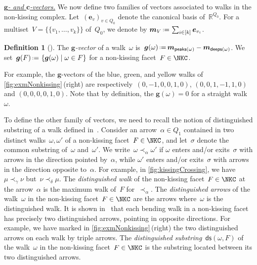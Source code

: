 \documentclass{amsart}
\theoremstyle{definition}
\newtheorem{definition}[theorem]{Definition}
\newcommand{\R}{\mathbb{R}} %
\renewcommand{\b}[1]{{\boldsymbol{#1}}} %
\newcommand{\set}[2]{\left\{ #1 \;\middle|\; #2 \right\}} %
\newcommand{\eqdef}{\mbox{\,\raisebox{0.2ex}{\scriptsize\ensuremath{\mathrm:}}\ensuremath{=}\,}} %
\newcommand{\darkblue}{\color{darkblue}} %
\newcommand{\defn}[1]{\textsl{\darkblue #1}} %
\newcommand{\para}[1]{\medskip\noindent\uline{\textit{#1.}}} %
\newcommand{\multiplicityVector}{\b{m}} %
\newcommand{\gvector}[1]{\b{g}(#1)} %
\newcommand{\gvectors}[1]{\b{g}(#1)} %
\newcommand{\peaks}[1]{\mathsf{peaks}(#1)} %
\newcommand{\deeps}[1]{\mathsf{deeps}(#1)} %
\newcommand{\distinguishedString}[2]{\mathsf{ds}(#1,#2)} %
\begin{document}
\para{$\b{g}$- and $\b{c}$-vectors}
%
We now define two families of vectors associated to walks in the non-kissing complex.
Let~$(\b{e}_v)_{v \in Q_0}$ denote the canonical basis of~$\R^{Q_0}$.
For a multiset~$V = \{\!\{v_1, \dots, v_k\}\!\}$ of~$Q_0$, we denote by $\multiplicityVector_V \eqdef \sum_{i \in [k]} \b{e}_{v_i}$.

\begin{definition}[{\cite[Def.~{4.8}]{PaluPilaudPlamondon-nonkissing}}]
The \defn{$\b{g}$-vector} of a walk~$\omega$ is~$\gvector{\omega} \eqdef \multiplicityVector_{\peaks{\omega}} - \multiplicityVector_{\deeps{\omega}}$.
We set~$\gvectors{F} \eqdef \set{\gvector{\omega}}{\omega \in F}$ for a non-kissing facet~$F \in \NKC$.
\end{definition}

For example, the $\b{g}$-vectors of the blue, green, and yellow walks of \cref{fig:exmNonkissing}\,(right) are respectively~$(0, -1, 0, 0, 1, 0)$, $(0, 0, 1, -1, 1, 0)$ and $(0, 0, 0, 0, 1, 0)$.
Note that by definition, the $\gvector{\omega} = 0$ for a straight walk~$\omega$.

To define the other family of vectors, we need to recall the notion of distinguished substring of a walk defined in~\cite[Def.~2.25]{PaluPilaudPlamondon-nonkissing}.
Consider an arrow~$\alpha \in Q_1$ contained in two distinct walks~$\omega, \omega'$ of a non-kissing facet~$F \in \NKC$, and let~$\sigma$ denote the common substring of~$\omega$ and~$\omega'$.
We write~$\omega \prec_\alpha \omega'$ if $\omega$ enters and/or exits~$\sigma$ with arrows in the direction pointed by~$\alpha$, while $\omega'$ enters and/or exits~$\sigma$ with arrows in the direction opposite to~$\alpha$.
For example, in \cref{fig:kissingCrossing}, we have~$\mu \prec_\gamma \nu$ but~$\nu \prec_\delta \mu$.
The \defn{distinguished walk} of the non-kissing facet~$F \in \NKC$ at the arrow~$\alpha$ is the maximum walk of~$F$ for~$\prec_\alpha$.
The \defn{distinguished arrows} of the walk~$\omega$ in the non-kissing facet~$F \in \NKC$ are the arrows where~$\omega$ is the distinguished walk.
It is shown in~\cite[Prop.~2.28]{PaluPilaudPlamondon-nonkissing} that each bending walk in a non-kissing facet has precisely two distinguished arrows, pointing in opposite directions.
For example, we have marked in \cref{fig:exmNonkissing}\,(right) the two distinguished arrows on each walk by triple arrows.
The \defn{distinguished substring}~$\distinguishedString{\omega}{F}$ of the walk~$\omega$ in the non-kissing facet~$F \in \NKC$ is the substring located between its two distinguished arrows.
\end{document}
